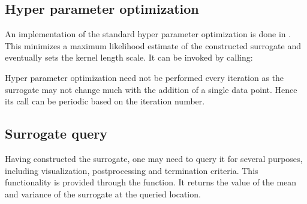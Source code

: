 \documentclass[letterpaper,12pt,english]{sphinxmanual}
\begin{document}
\subsection{Hyper parameter optimization}
\label{\detokenize{examples/getting_started_example:hyper-parameter-optimization}}
\sphinxAtStartPar
An implementation of the standard hyper parameter optimization is done in .
This minimizes a maximum likelihood estimate of the constructed surrogate and eventually sets the  kernel
length scale. It can be invoked by calling:

\begin{sphinxVerbatim}[commandchars=\\\{\}]
  
  
\PYG{p}{[}\PYG{p}{[} \PYG{p}{]}\PYG{p}{]}
\end{sphinxVerbatim}

\sphinxAtStartPar
Hyper parameter optimization need not be performed every iteration as the surrogate may not change much with the
addition of a single data point. Hence its call can be periodic based on the iteration number.


\subsection{Surrogate query}
\label{\detokenize{examples/getting_started_example:surrogate-query}}
\sphinxAtStartPar
Having constructed the surrogate, one may need to query it for several purposes, including visualization, post\sphinxhyphen{}processing
and termination criteria. This functionality is provided through the  function. It
returns the value of the mean and variance of the surrogate at the queried location.

\begin{sphinxVerbatim}[commandchars=\\\{\}]
  \PYG{p}{[}\PYG{p}{]}
   
\end{sphinxVerbatim}
\end{document}
